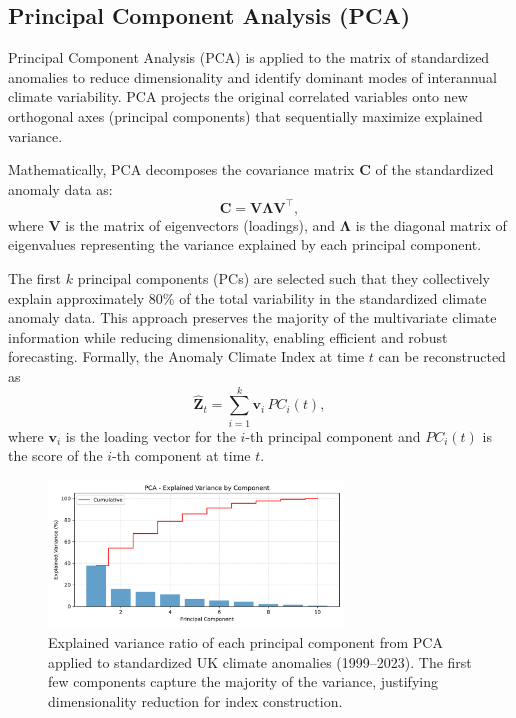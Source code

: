 \documentclass[12pt,a4paper]{report}
\begin{document}
\subsection{Principal Component Analysis (PCA)}
Principal Component Analysis (PCA) is applied to the matrix of standardized anomalies to reduce dimensionality and identify dominant modes of interannual climate variability. PCA projects the original correlated variables onto new orthogonal axes (principal components) that sequentially maximize explained variance.

Mathematically, PCA decomposes the covariance matrix \( \mathbf{C} \) of the standardized anomaly data as:
\[
\mathbf{C} = \mathbf{V} \mathbf{\Lambda} \mathbf{V}^\top,
\]
where \( \mathbf{V} \) is the matrix of eigenvectors (loadings), and \( \mathbf{\Lambda} \) is the diagonal matrix of eigenvalues representing the variance explained by each principal component.

The first \(k\) principal components (PCs) are selected such that they collectively explain approximately 80\% of the total variability in the standardized climate anomaly data. This approach preserves the majority of the multivariate climate information while reducing dimensionality, enabling efficient and robust forecasting. Formally, the Anomaly Climate Index at time \(t\) can be reconstructed as
\[
\hat{\mathbf{Z}}_t = \sum_{i=1}^k \mathbf{v}_i \, PC_i(t),
\]
where \(\mathbf{v}_i\) is the loading vector for the \(i\)-th principal component and \(PC_i(t)\) is the score of the \(i\)-th component at time \(t\).

\begin{figure}[H]
    \centering
    \includegraphics[width=0.7\textwidth]{pca_explained_variance_report.png}
    \caption{Explained variance ratio of each principal component from PCA applied to standardized UK climate anomalies (1999--2023). The first few components capture the majority of the variance, justifying dimensionality reduction for index construction.}
    \label{fig:pca_explained_variance}
\end{figure}
\end{document}
